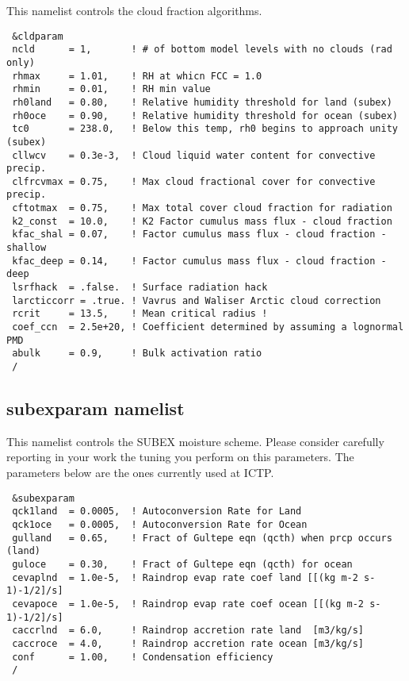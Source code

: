 This namelist controls the cloud fraction algorithms.

{\footnotesize
\begin{Verbatim}
 &cldparam
 ncld      = 1,       ! # of bottom model levels with no clouds (rad only)
 rhmax     = 1.01,    ! RH at whicn FCC = 1.0
 rhmin     = 0.01,    ! RH min value
 rh0land   = 0.80,    ! Relative humidity threshold for land (subex)
 rh0oce    = 0.90,    ! Relative humidity threshold for ocean (subex)
 tc0       = 238.0,   ! Below this temp, rh0 begins to approach unity (subex)
 cllwcv    = 0.3e-3,  ! Cloud liquid water content for convective precip.
 clfrcvmax = 0.75,    ! Max cloud fractional cover for convective precip.
 cftotmax  = 0.75,    ! Max total cover cloud fraction for radiation
 k2_const  = 10.0,    ! K2 Factor cumulus mass flux - cloud fraction
 kfac_shal = 0.07,    ! Factor cumulus mass flux - cloud fraction - shallow
 kfac_deep = 0.14,    ! Factor cumulus mass flux - cloud fraction - deep
 lsrfhack  = .false.  ! Surface radiation hack
 larcticcorr = .true. ! Vavrus and Waliser Arctic cloud correction
 rcrit     = 13.5,    ! Mean critical radius ! 
 coef_ccn  = 2.5e+20, ! Coefficient determined by assuming a lognormal PMD
 abulk     = 0.9,     ! Bulk activation ratio
 /
\end{Verbatim}
}

\subsection{subexparam namelist}

This namelist controls the SUBEX moisture scheme. Please consider carefully
reporting in your work the tuning you perform on this parameters.
The parameters below are the ones currently used at ICTP.

{\footnotesize
\begin{Verbatim}
 &subexparam
 qck1land  = 0.0005,  ! Autoconversion Rate for Land
 qck1oce   = 0.0005,  ! Autoconversion Rate for Ocean
 gulland   = 0.65,    ! Fract of Gultepe eqn (qcth) when prcp occurs (land)
 guloce    = 0.30,    ! Fract of Gultepe eqn (qcth) for ocean
 cevaplnd  = 1.0e-5,  ! Raindrop evap rate coef land [[(kg m-2 s-1)-1/2]/s]
 cevapoce  = 1.0e-5,  ! Raindrop evap rate coef ocean [[(kg m-2 s-1)-1/2]/s]
 caccrlnd  = 6.0,     ! Raindrop accretion rate land  [m3/kg/s]
 caccroce  = 4.0,     ! Raindrop accretion rate ocean [m3/kg/s]
 conf      = 1.00,    ! Condensation efficiency
 /
\end{Verbatim}
}

